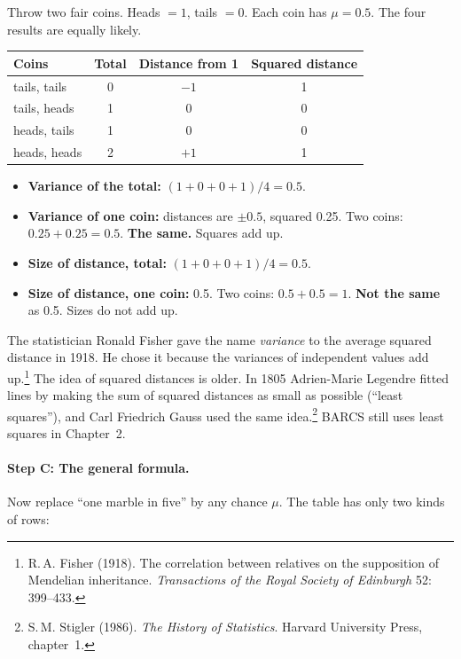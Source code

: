 \begin{worked}
Throw two fair coins. Heads $= 1$, tails $= 0$. Each coin has $\mu = 0.5$.
The four results are equally likely.

\begin{center}
\begin{tabular}{@{}lccc@{}}
\toprule
Coins & Total & Distance from 1 & Squared distance\\
\midrule
tails, tails & 0 & $-1$ & 1\\
tails, heads & 1 & 0 & 0\\
heads, tails & 1 & 0 & 0\\
heads, heads & 2 & $+1$ & 1\\
\bottomrule
\end{tabular}
\end{center}

\begin{itemize}[leftmargin=1.2em]
\item \textbf{Variance of the total:} $(1 + 0 + 0 + 1) / 4 = 0.5$.
\item \textbf{Variance of one coin:} distances are $\pm 0.5$, squared
  0.25. Two coins: $0.25 + 0.25 = 0.5$. \textbf{The same.} Squares add up.
\item \textbf{Size of distance, total:} $(1 + 0 + 0 + 1) / 4 = 0.5$.
\item \textbf{Size of distance, one coin:} 0.5. Two coins: $0.5 + 0.5 = 1$.
  \textbf{Not the same} as 0.5. Sizes do not add up.
\end{itemize}
\end{worked}

The statistician Ronald Fisher gave the name \emph{variance} to the average
squared distance in 1918. He chose it because the variances of independent
values add up.\footnote{R.\,A. Fisher (1918). The correlation between relatives on the supposition of Mendelian inheritance. \emph{Transactions of the Royal Society of Edinburgh} 52: 399--433.} The idea of squared distances is older. In
1805 Adrien-Marie Legendre fitted lines by making the sum of squared
distances as small as possible (``least squares''), and Carl Friedrich Gauss
used the same idea.\footnote{S.\,M. Stigler (1986). \emph{The History of Statistics}. Harvard University Press, chapter~1.} BARCS still uses least squares in
Chapter~2.

\paragraph{Step C: The general formula.} Now replace ``one marble in five''
by any chance $\mu$. The table has only two kinds of rows:

